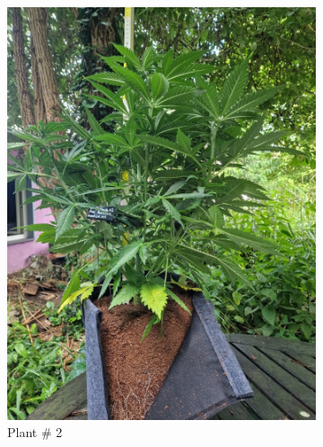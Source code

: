 \begin{figure}[htbp]
    \begin{subfigure}[t]{.28\textwidth}
        \includegraphics[width=\linewidth]{plant_02_2024-06-17}
        \caption{Plant \# 2}
        \label{fig:plant_02_2024-06-17}
    \end{subfigure}
    \begin{subfigure}[t]{.28\textwidth}

\end{subfigure}
\end{figure}
